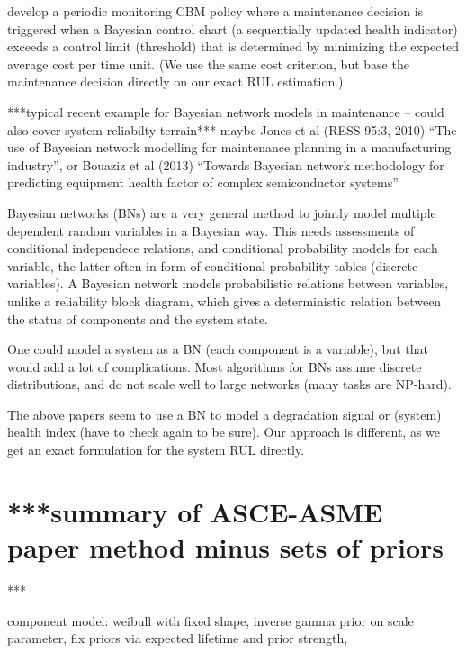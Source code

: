 \documentclass[authoryear]{elsarticle}
\begin{document}
\cite{2011:kim-et-al} develop a periodic monitoring CBM policy
where a maintenance decision is triggered when
a Bayesian control chart (a sequentially updated health indicator) %
exceeds a control limit (threshold) that is determined
by minimizing the expected average cost per time unit.
(We use the same cost criterion, but base the maintenance decision directly on our exact RUL estimation.)

***typical recent example for Bayesian network models in maintenance -- could also cover system reliabilty terrain***
maybe Jones et al (RESS 95:3, 2010) ``The use of Bayesian network modelling for maintenance planning in a manufacturing industry'',
or Bouaziz et al (2013) ``Towards Bayesian network methodology for predicting equipment health factor of complex semiconductor systems''

\begin{scriptsize}
Bayesian networks (BNs) are a very general method to jointly model multiple dependent random variables in a Bayesian way. 
This needs assessments of conditional independece relations, and conditional probability models for each variable,
the latter often in form of conditional probability tables (discrete variables).
A Bayesian network models probabilistic relations between variables,
unlike a reliability block diagram, which gives a deterministic relation
between the status of components and the system state.

One could model a system as a BN (each component is a variable),
but that would add a lot of complications.
Most algorithms for BNs assume discrete distributions,
and do not scale well to large networks (many tasks are NP-hard).

The above papers seem to use a BN to model a degradation signal or (system) health index (have to check again to be sure).
Our approach is different, as we get an exact formulation for the system RUL directly.

\end{scriptsize}


\section{***summary of ASCE-ASME paper method minus sets of priors}

***\cite{2016:walter-coolen}

component model: weibull with fixed shape,
inverse gamma prior on scale parameter,
fix priors via expected lifetime and prior strength,
\end{document}
